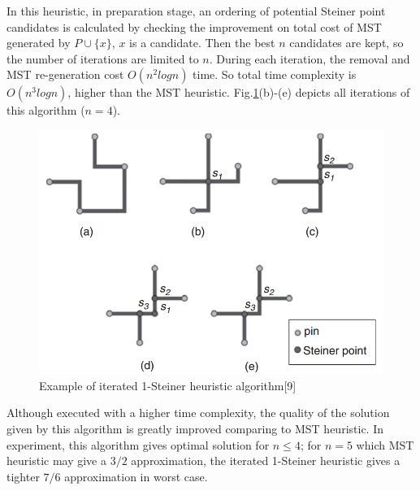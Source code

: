 \documentclass[11pt,twoside, onecolumn]{IEEEtran}
\begin{document}
In this heuristic, in preparation stage, an ordering of potential Steiner point candidates is calculated by checking the improvement on total
cost of MST generated by $P \cup \{x\}$, $x$ is a candidate. Then the best $n$ candidates are kept,
so the number of iterations are limited to $n$. During each iteration, the removal and MST re-generation
cost $O(n^2logn)$ time. So total time complexity is $O(n^3logn)$, higher than the MST heuristic.
Fig.\ref{fig:iter}(b)-(e) depicts all iterations of this algorithm ($n=4$).

\begin{figure}[hbt]
	\begin{center}
	\includegraphics[scale=0.4]{iter.png}
	\end{center}
	\caption{Example of iterated 1-Steiner heuristic algorithm[9]}
	\label{fig:iter}
\end{figure}

Although executed with a higher time complexity, the quality of the solution given by this algorithm is 
greatly improved comparing to MST heuristic. In experiment, this algorithm gives optimal solution for
$n\leq 4$; for $n=5$ which MST heuristic may give a $3/2$ approximation, the iterated 1-Steiner heuristic
gives a tighter $7/6$ approximation in worst case.
\end{document}
